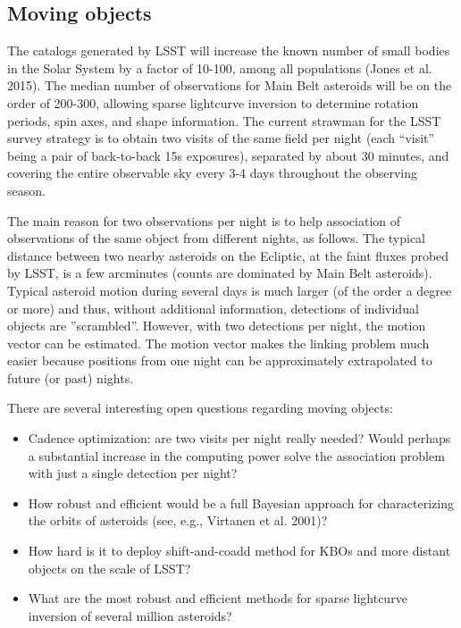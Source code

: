\documentclass{iau}
\begin{document}



\subsection{Moving objects}

The catalogs generated by LSST will increase the known number of small
bodies in the Solar System by a factor of 10-100, among all
populations (Jones et al. 2015). The median number of observations for
Main Belt asteroids will be on the order of 200-300, allowing sparse
lightcurve inversion to determine rotation periods, spin axes, and
shape information. The current strawman for the LSST survey strategy
is to obtain two visits of the same field per night (each ``visit''
being a pair of back-to-back 15s exposures), separated by about 30
minutes, and covering the entire observable sky every 3-4 days
throughout the observing season.

The main reason for two observations per night is to help association of observations of the same object from 
different nights, as follows. The typical distance between two nearby asteroids on the Ecliptic, at the faint fluxes 
probed by LSST, is a few arcminutes (counts are dominated by Main Belt asteroids). Typical asteroid motion during 
several days is much larger (of the order a degree or more) and thus, without additional information, detections of individual 
objects are ''scrambled''. However, with two detections per night, the motion vector can be estimated. The motion 
vector makes the linking problem much easier because positions from one night can be approximately extrapolated 
to future (or past) nights.

There are several interesting open questions regarding moving objects: 
\begin{itemize}
\item Cadence optimization: are two visits per night really needed?
  Would perhaps a substantial increase in the computing power solve
  the association problem with just a single detection per night?
\item How robust and efficient would be a full Bayesian approach for
  characterizing the orbits of asteroids (see, e.g., Virtanen et al. 2001)? 
\item How hard is it to deploy shift-and-coadd method for KBOs and
  more distant objects on the scale of LSST?
\item What are the most robust and efficient methods for sparse lightcurve inversion of several million asteroids? 
\end{itemize}
\end{document}
